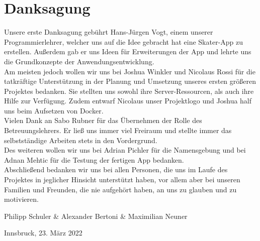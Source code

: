 \section*{Danksagung}
Unsere erste Danksagung gebührt Hans-Jürgen Vogt, einem unserer Programmierlehrer, welcher uns auf
die Idee gebracht hat eine Skater-App zu erstellen. Außerdem gab er uns Ideen für Erweiterungen der
App und lehrte uns die Grundkonzepte der Anwendungsentwicklung. \\

Am meisten jedoch wollen wir uns bei Joshua Winkler und Nicolaus Rossi für die tatkräftige
Unterstützung in der Planung und Umsetzung unseres ersten größeren Projektes bedanken. Sie stellten uns sowohl
ihre Server-Ressourcen, als auch ihre Hilfe zur Verfügung. Zudem entwarf Nicolaus unser Projektlogo
und Joshua half uns beim Aufsetzen von Docker. \\

Vielen Dank an Sabo Rubner für das Übernehmen der Rolle des Betreuungslehrers. Er ließ uns immer
viel Freiraum und stellte immer das selbstständige Arbeiten stets in den Vordergrund. \\

Des weiteren wollen wir uns bei Adrian Pichler für die Namensgebung und bei Adnan Mehtic für die
Testung der fertigen App bedanken. \\

Abschließend bedanken wir uns bei allen Personen, die uns im Laufe des Projektes in jeglicher
Hinsicht unterstützt haben, vor allem aber bei unseren Familien und Freunden, die nie aufgehört
haben, an uns zu glauben und zu motivieren. \\

\vspace{2cm}

Philipp Schuler \& Alexander Bertoni \& Maximilian Neuner

Innsbruck, 23. März 2022

\newpage